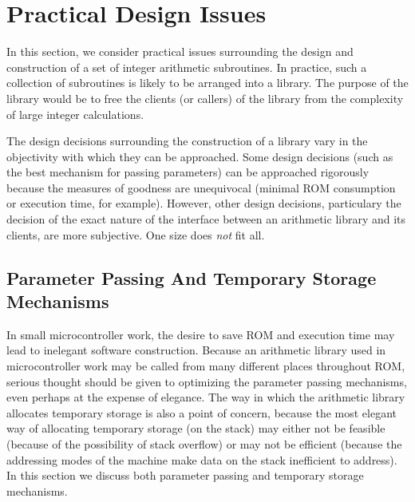 \section{Practical Design Issues}
\label{ccil0:spdi0}

In this section, we consider practical issues surrounding the design
and construction of a set of integer arithmetic subroutines.
In practice, such a collection of subroutines is likely to be
arranged into a library.  The purpose of the library would be to
free the clients (or callers) of the library from the complexity of 
large integer calculations.

The design decisions surrounding the construction of a library vary in
the objectivity with which they can be approached.  Some design decisions
(such as the best mechanism for passing parameters) can be approached
rigorously because the measures of goodness are unequivocal (minimal ROM consumption
or execution time, for example).  However, other design decisions, particulary the
decision of the exact nature of the interface between an arithmetic library and
its clients, are more subjective.  One size does \emph{not} fit all.


\subsection{Parameter Passing And Temporary Storage Mechanisms}
\label{ccil0:spdi0:sppm0}

In small microcontroller work, the desire to save ROM and execution time
may lead to inelegant software construction.  Because an arithmetic library
used in microcontroller work may be called from many different places 
throughout ROM, serious thought should be given to optimizing the 
parameter passing mechanisms, even perhaps at the expense of elegance.
The way in which the arithmetic library allocates temporary storage is
also a point of concern, because the most elegant way of allocating temporary
storage (on the stack) may either not be feasible (because of the possibility
of stack overflow) or may not be efficient (because the addressing modes of
the machine make data on the stack inefficient to address).  In this section
we discuss both parameter passing and temporary storage mechanisms.

